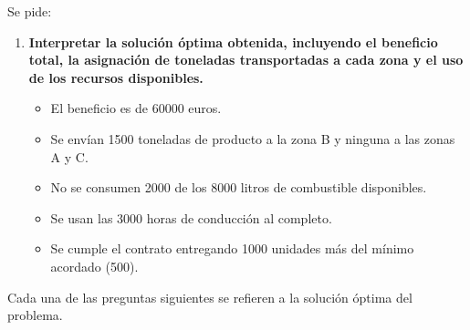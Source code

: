 Se pide:

\begin{enumerate}
    \item \textbf{Interpretar la solución óptima obtenida, incluyendo el beneficio total, la asignación de toneladas transportadas a cada zona y el uso de los recursos disponibles.}

    \begin{itemize}
        \item El beneficio es de 60000 euros.
        \item Se envían 1500 toneladas de producto a la zona B y ninguna a las zonas A y C.
        \item No se consumen 2000 de los 8000 litros de combustible disponibles.
        \item Se usan las 3000 horas de conducción al completo.
        \item Se cumple el contrato entregando 1000 unidades más del mínimo acordado (500).
    \end{itemize}
        
    
    
\end{enumerate}

Cada una de las preguntas siguientes se refieren a la solución óptima del problema.

